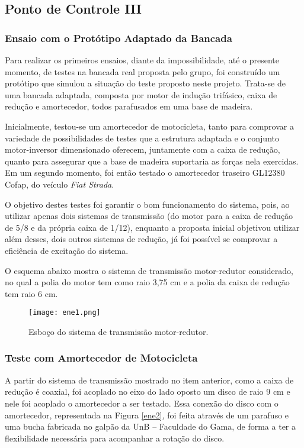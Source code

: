 \newpage
\subsection{Ponto de Controle III}
\subsubsection{Ensaio com o Protótipo Adaptado da Bancada}
	
	Para realizar os primeiros ensaios, diante da impossibilidade, até o presente momento, de testes na bancada real proposta pelo grupo, foi construído um protótipo que simulou a situação do teste proposto neste projeto. Trata-se de uma bancada adaptada, composta por motor de indução trifásico, caixa de redução e amortecedor, todos parafusados em uma base de madeira. 
	
	Inicialmente, testou-se um amortecedor de motocicleta, tanto para comprovar a variedade de possibilidades de testes que a estrutura adaptada e o conjunto motor-inversor dimensionado oferecem, juntamente com a caixa de redução, quanto para assegurar que a base de madeira suportaria as forças nela exercidas. Em um segundo momento, foi então testado o amortecedor traseiro GL12380 Cofap, do veículo \textit{Fiat Strada}.

	O objetivo destes testes foi garantir o bom funcionamento do sistema, pois, ao utilizar apenas dois sistemas de transmissão (do motor para a caixa de redução de 5/8 e da própria caixa de 1/12), enquanto a proposta inicial objetivou utilizar além desses, dois outros sistemas de redução, já foi possível se comprovar a eficiência de excitação do sistema. 
	
	O esquema abaixo mostra o sistema de transmissão motor-redutor considerado, no qual a polia do motor tem como raio 3,75 cm e a polia da caixa de redução tem raio 6 cm.

	\begin{figure}[!hbtp]
		\centering
		\texttt{[image: ene1.png]}
		\caption{Esboço do sistema de transmissão motor-redutor.} 
		\label{ene1}
	\end{figure}

\subsubsection{Teste com Amortecedor de Motocicleta}
	
	A partir do sistema de transmissão mostrado no item anterior, como a caixa de redução é coaxial, foi acoplado no eixo do lado oposto um disco de raio 9 cm e nele foi acoplado o amortecedor a ser testado. Essa conexão do disco com o amortecedor, representada na Figura \ref{ene2}, foi feita através de um parafuso e uma bucha fabricada no galpão da UnB – Faculdade do Gama, de forma a ter a flexibilidade necessária para acompanhar a rotação do disco. 
	
